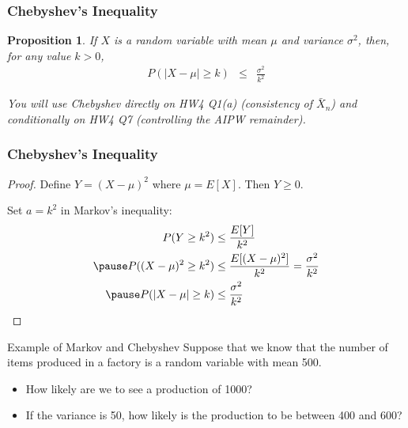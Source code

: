 \documentclass[handout, aspectratio=169]{beamer}
\newtheorem{prop}{Proposition}
\numberwithin{equation}{section}
\begin{document}

\begin{frame}
\frametitle{Chebyshev's Inequality}

\begin{prop}
If $X$ is a random variable with mean $\mu$ and variance $\sigma^2$, then, for any value $k>0$,
\begin{eqnarray}
P(|X - \mu| \geq k) & \leq & \frac{\sigma^2}{k^2} \nonumber
\end{eqnarray}

\end{prop}

\medskip
\textit{You will use Chebyshev directly on HW4 Q1(a) (consistency of $\bar{X}_n$) and conditionally on HW4 Q7 (controlling the AIPW remainder).}

\end{frame}


\begin{frame}
\frametitle{Chebyshev's Inequality}

\begin{proof}
Define $Y = (X - \mu)^2$ where $\mu = E[X]$. Then $Y \geq 0$. \pause

Set $a = k^2$ in Markov's inequality: \pause
\begin{align*}
P(Y \geq k^2) &\leq \frac{E[Y]}{k^2} \\ \pause
P( (X- \mu)^2 \geq k^2) &\leq \frac{E[(X - \mu)^2]}{k^2} = \frac{\sigma^2}{k^2} \\ \pause
P( |X - \mu| \geq k) &\leq \frac{\sigma^2}{k^2}
\end{align*}
\end{proof}

\end{frame}


\begin{frame}{Example of Markov and Chebyshev}
Suppose that we know that the number of items produced in a factory is a random variable with mean 500.
\begin{itemize}
\item How likely are we to see a production of 1000?
\item If the variance is 50, how likely is the production to be between 400 and 600?
\end{itemize}

\end{frame}
\end{document}
